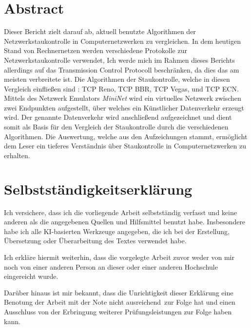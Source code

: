\documentclass[paper=a4,fontsize=12pt,ngerman]{scrartcl}
\begin{document}
\pagestyle{plain}



\section*{Abstract}



Dieser Bericht zielt darauf ab, aktuell benutzte Algorithmen der Netzwerkstaukontrolle in Computernetzwerken zu vergleichen.
In dem heutigen Stand von Rechnernetzen werden verschiedene Protokolle zur Netzwerkstaukontrolle verwendet, 
Ich werde mich im Rahmen dieses Berichts allerdings auf das Transmission Control Protocoll beschränken, da dies das am meisten verbreitete ist.  \newline
Die Algorithmen der Staukontrolle, welche in diesen Vergleich einfließen sind : TCP Reno, TCP BBR, TCP Vegas, und TCP ECN.
\newline
Mittels des Netzwerk Emulators \textit{MiniNet} wird ein virtuelles Netzwerk zwischen zwei Endpunkten aufgestellt, über
welches ein Künstlicher Datenverkehr erzeugt wird.
Der genannte Datenverkehr wird anschließend aufgezeichnet und dient somit als Basis für den Vergleich der Staukontrolle durch 
die verschiedenen Algorithmen.
Die Auswertung, welche aus den Aufzeichungen stammt, ermöglicht dem Leser ein tieferes Verständnis über Staukontrolle in Computernetzwerken
zu erhalten. 




\newpage
\section*{Selbstständigkeitserklärung}
Ich versichere, dass ich die vorliegende Arbeit selbstständig verfasst und 
keine anderen als die angegebenen Quellen und Hilfsmittel benutzt habe.
Insbesondere habe ich alle KI-basierten Werkzeuge angegeben, die ich bei
der Erstellung, Übersetzung oder Überarbeitung des Textes verwendet habe.

Ich erkläre hiermit weiterhin, dass die vorgelegte Arbeit zuvor weder von mir 
noch von einer anderen Person an dieser oder einer anderen Hochschule 
eingereicht wurde.

Darüber hinaus ist mir bekannt, dass die Unrichtigkeit dieser Erklärung eine 
Benotung der Arbeit mit der Note \glqq nicht ausreichend\grqq \ zur Folge hat 
und einen Ausschluss von der Erbringung weiterer Prüfungsleistungen zur Folge 
haben kann.
\bigskip
 
\end{document}
